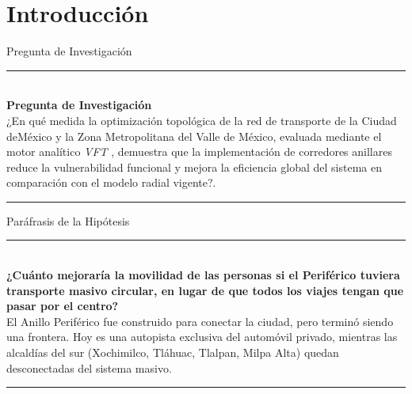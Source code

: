 
\section{Introducción}
\label{sec:introduccion}

\begin{frame}[c]{Pregunta de Investigación}
  \hspace{0.8cm}%
  \begin{minipage}{0.88\textwidth}
    {\color{ColorAcento}\rule{0.5\textwidth}{1.2pt}}\\[0.4cm]
    {\large\bfseries\color{ColorPrincipal}
      Pregunta de Investigación}\\[0.6cm]
    {\normalsize\color{black}
      ¿En qué medida la optimización topológica de la red de transporte 
      de la Ciudad deMéxico y la Zona Metropolitana del Valle de México, 
      evaluada mediante el motor analítico \textit{VFT} \cite{garibaldi2023vft}, 
      demuestra que la implementación de corredores anillares reduce 
      la vulnerabilidad funcional y mejora la eficiencia global del sistema en 
      comparación con el modelo radial vigente?.}\\[0.5cm]
    {\color{ColorAcento}\rule{0.3\textwidth}{0.8pt}}
    \vfill
  \end{minipage}
\end{frame}

\begin{frame}[c]{Paráfrasis de la Hipótesis}
  \hspace{0.8cm}%
  \begin{minipage}{0.88\textwidth}
    {\color{ColorAcento}\rule{0.5\textwidth}{1.2pt}}\\[0.4cm]
    {\large\bfseries\color{ColorPrincipal}
        ¿Cuánto mejoraría la movilidad de las personas si el
        Periférico tuviera transporte masivo circular,
        en lugar de
        que todos los viajes tengan que pasar por el centro?}\\[0.5cm]
    {\normalsize\color{black}
      El Anillo Periférico fue construido para conectar la ciudad,
      pero terminó siendo una frontera. Hoy es una autopista
      exclusiva del automóvil privado, mientras las alcaldías
      del sur (Xochimilco, Tláhuac, Tlalpan, Milpa Alta)
      quedan desconectadas del sistema masivo.}\\[0.4cm]
    {\color{ColorAcento}\rule{0.3\textwidth}{0.8pt}}
  \end{minipage}
\end{frame}

